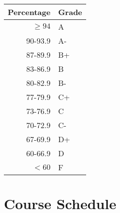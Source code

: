 \documentclass{tufte-handout}
\begin{document}
\begin{fullwidth}
\begin{tabular}{rl}
Percentage & Grade \\
\hline 
$\ge94$ & A \\
90-93.9 & A- \\
87-89.9 & B+ \\
83-86.9 & B \\
80-82.9 & B- \\
77-79.9 & C+ \\
73-76.9 & C \\
70-72.9 & C- \\
67-69.9 & D+ \\
60-66.9 & D \\
$<60$ & F \\
\hline
\end{tabular}

\end{fullwidth}






\section{Course Schedule}
\end{document}
